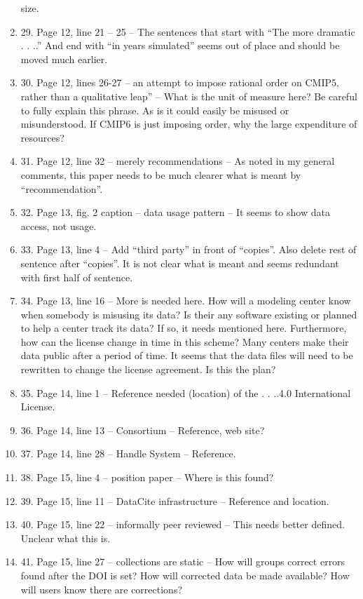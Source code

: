 \documentclass[gmd,manuscript]{copernicus}
\begin{document}
\begin{enumerate}[label=RC1-\arabic*,leftmargin=*]
  size.
\item 29. Page 12, line 21 – 25 – The sentences that start with “The
  more dramatic . . ..” And end with “in years simulated” seems out of
  place and should be moved much earlier.
\item 30. Page 12, lines 26-27 – an attempt to impose rational order
  on CMIP5, rather than a qualitative leap” – What is the unit of
  measure here? Be careful to fully explain this phrase. As is it
  could easily be misused or misunderstood. If CMIP6 is just imposing
  order, why the large expenditure of resources?
\item 31. Page 12, line 32 – merely recommendations – As noted in my
  general comments, this paper needs to be much clearer what is meant
  by “recommendation”.
\item 32. Page 13, fig. 2 caption – data usage pattern – It seems to
  show data access, not usage.
\item 33. Page 13, line 4 – Add “third party” in front of “copies”.
  Also delete rest of sentence after “copies”. It is not clear what is
  meant and seems redundant with first half of sentence.
\item 34. Page 13, line 16 – More is needed here. How will a modeling
  center know when somebody is misusing its data? Is their any
  software existing or planned to help a center track its data? If so,
  it needs mentioned here. Furthermore, how can the license change in
  time in this scheme? Many centers make their data public after a
  period of time. It seems that the data files will need to be
  rewritten to change the license agreement. Is this the plan?
\item 35. Page 14, line 1 – Reference needed (location) of the . .
  ..4.0 International License.
\item 36. Page 14, line 13 – Consortium – Reference, web site?
\item 37. Page 14, line 28 – Handle System – Reference.
\item 38. Page 15, line 4 – position paper – Where is this found?
\item 39. Page 15, line 11 – DataCite infrastructure – Reference and
  location.
\item 40. Page 15, line 22 – informally peer reviewed – This needs
  better defined. Unclear what this is.
\item 41. Page 15, line 27 – collections are static – How will groups
  correct errors found after the DOI is set? How will corrected data
  be made available? How will users know there are corrections?

\end{enumerate}
\end{document}
